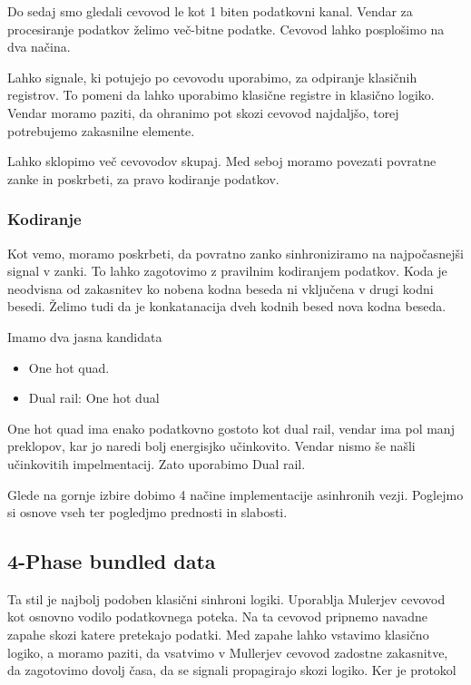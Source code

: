 Do sedaj smo gledali cevovod le kot 1 biten podatkovni kanal. Vendar za procesiranje podatkov želimo več-bitne podatke. Cevovod lahko posplošimo na dva načina. 

Lahko signale, ki potujejo po cevovodu uporabimo, za odpiranje klasičnih registrov. To pomeni da lahko uporabimo klasične registre in klasično logiko. Vendar moramo paziti, da ohranimo pot skozi cevovod najdaljšo, torej potrebujemo zakasnilne elemente.

Lahko sklopimo več cevovodov skupaj. Med seboj moramo povezati povratne zanke in poskrbeti, za pravo kodiranje podatkov.

\subsubsection{Kodiranje} \label{b}
Kot vemo, moramo poskrbeti, da povratno zanko sinhroniziramo na najpočasnejši signal v zanki. To lahko zagotovimo z pravilnim kodiranjem podatkov. Koda je neodvisna od zakasnitev ko nobena kodna beseda ni vključena v drugi kodni besedi. Želimo tudi da je konkatanacija dveh kodnih besed nova kodna beseda.

Imamo dva jasna kandidata

\begin{itemize}
	\item One hot quad.
	\item Dual rail: One hot dual
\end{itemize}

One hot quad ima enako podatkovno gostoto kot dual rail, vendar ima pol manj preklopov, kar jo naredi bolj energisjko učinkovito. Vendar nismo še našli učinkovitih impelmentacij. Zato uporabimo Dual rail.

%
%

Glede na gornje izbire dobimo 4 načine implementacije asinhronih vezji. Poglejmo si osnove vseh ter pogledjmo prednosti in slabosti.

\subsection{4-Phase bundled data} \label{b}
Ta stil je najbolj podoben klasični sinhroni logiki. Uporablja Mulerjev cevovod kot osnovno vodilo podatkovnega poteka. Na ta cevovod pripnemo navadne zapahe skozi katere pretekajo podatki. Med zapahe lahko vstavimo klasično logiko, a moramo paziti, da vsatvimo v Mullerjev cevovod zadostne zakasnitve, da zagotovimo dovolj časa, da se signali propagirajo skozi logiko. Ker je protokol 


